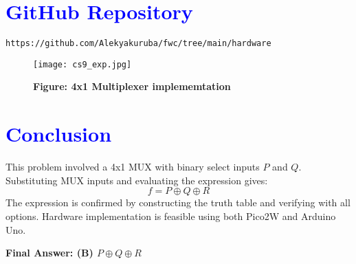 \documentclass[twocolumn]{article}
\begin{document}
\section*{\textcolor{blue}{GitHub Repository}}
\texttt{https://github.com/Alekyakuruba/fwc/tree/main/hardware}
\begin{figure}[h]
    \centering
    \texttt{[image: cs9\_exp.jpg]}
    \caption*{\textbf{Figure: 4x1 Multiplexer implememtation}}
\end{figure}

\section*{\textcolor{blue}{Conclusion}}
This problem involved a 4x1 MUX with binary select inputs $P$ and $Q$. Substituting MUX inputs and evaluating the expression gives:
\[f = P \oplus Q \oplus R\]
The expression is confirmed by constructing the truth table and verifying with all options. Hardware implementation is feasible using both Pico2W and Arduino Uno.

\textbf{Final Answer: (B) $P \oplus Q \oplus R$}
\end{document}
